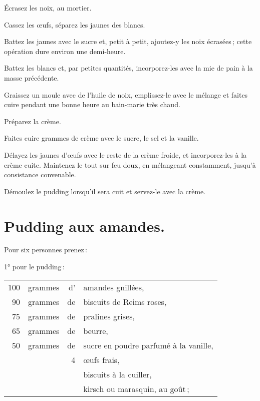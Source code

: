 Écrasez les noix, au mortier.

Cassez les œufs, séparez les jaunes des blancs.

Battez les jaunes avec le sucre et, petit à petit, ajoutez-y les noix
écrasées ; cette opération dure environ une demi-heure.

Battez les blancs et, par petites quantités, incorporez-les avec la mie de pain
à la masse précédente.

Graissez un moule avec de l'huile de noix, emplissez-le avec le mélange et
faites cuire pendant une bonne heure au bain-marie très chaud.

Préparez la crème.

Faites cuire {\mmm} grammes de crème avec le sucre, le sel et la
vanille.

Délayez les jaunes d'œufs avec le reste de la crème froide, et incorporez-les
à la crème cuite. Maintenez le tout sur feu doux, en mélangeant constamment,
jusqu'à consistance convenable.

Démoulez le pudding lorsqu'il sera cuit et servez-le avec la crème.

\section*{\centering Pudding aux amandes.}
{}

Pour six personnes prenez :

\medskip

1° pour le pudding :

\footnotesize
\begin{longtable}{rrrp{16em}}
    100 & grammes & d' & amandes gnillées,                                                                \\
     90 & grammes & de & biscuits de Reims roses,                                                         \\
     75 & grammes & de & pralines grises,                                                                 \\
     65 & grammes & de & beurre,                                                                          \\
     50 & grammes & de & sucre en poudre parfumé à la vanille,                                            \\
        &         &  4 & œufs frais,                                                                      \\
        &         &    & biscuits à la cuiller,                                                           \\
        &         &    & kirsch ou marasquin, au goût ;                                                   \\
\end{longtable}
\normalsize

